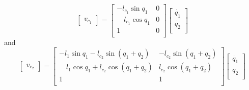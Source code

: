 \documentclass[a4paper,12pt,oneside,onecolumn]{article} %
\begin{document}
\begin{equation}
    \begin{bmatrix}
    v_{c_1}
    \end{bmatrix} = 
    \begin{bmatrix} 
    -l_{c_1}  \sin{q_1} & 0  \\ \quad l_{c_1}  \cos{q_1} & 0 \\ 1 & 0 \\
    \end{bmatrix}
    \begin{bmatrix}
    \dot{q_1} \\ \dot{q_2} \\
    \end{bmatrix} 
\end{equation}
and
\begin{equation}
    \begin{bmatrix}
    v_{c_2}
    \end{bmatrix} = 
    \begin{bmatrix} 
    -l_1  \sin{q_1} - l_{c_2}  \sin{(q_1 + q_2)}  & -l_{c_2}  \sin{(q_1 + q_2)}  \\ \quad l_1 \cos{q_1}  + l_{c_2}  \cos{(q_1 + q_2)}  & l_{c_2}  \cos{(q_1 + q_2)} \\ 1 & 1 \\
    \end{bmatrix}
    \begin{bmatrix}
    \dot{q_1} \\ \dot{q_2} \\
    \end{bmatrix} 
\end{equation}
\end{document}
